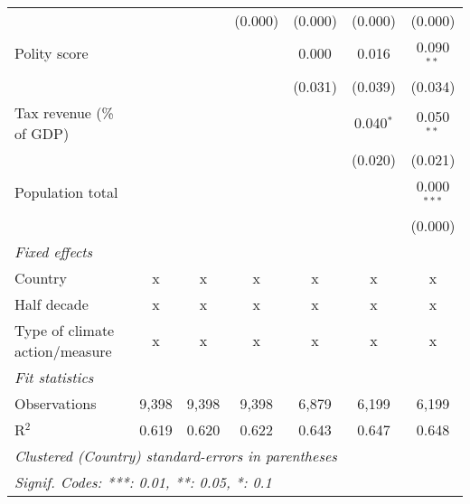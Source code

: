 \begin{tabular}{lcccccc}
                                                                                           &         &                & (0.000)        & (0.000)        & (0.000)        & (0.000)\\   
   Polity score                                                                            &         &                &                & 0.000          & 0.016          & 0.090$^{**}$\\   
                                                                                           &         &                &                & (0.031)        & (0.039)        & (0.034)\\   
   Tax revenue (\% of GDP)                                                                 &         &                &                &                & 0.040$^{*}$    & 0.050$^{**}$\\   
                                                                                           &         &                &                &                & (0.020)        & (0.021)\\   
   Population total                                                                        &         &                &                &                &                & 0.000$^{***}$\\   
                                                                                           &         &                &                &                &                & (0.000)\\   
   \emph{Fixed effects}\\
   Country                                                                                 & x       & x              & x              & x              & x              & x\\  
   Half decade                                                                             & x       & x              & x              & x              & x              & x\\  
   Type of climate action/measure                                                          & x       & x              & x              & x              & x              & x\\  
   \midrule \emph{Fit statistics}\\
   Observations                                                                            & 9,398   & 9,398          & 9,398          & 6,879          & 6,199          & 6,199\\  
   R$^2$                                                                                   & 0.619   & 0.620          & 0.622          & 0.643          & 0.647          & 0.648\\  
   \midrule
   \multicolumn{7}{l}{\emph{Clustered (Country) standard-errors in parentheses}}\\
   \multicolumn{7}{l}{\emph{Signif. Codes: ***: 0.01, **: 0.05, *: 0.1}}\\
\end{tabular}
\par\endgroup


